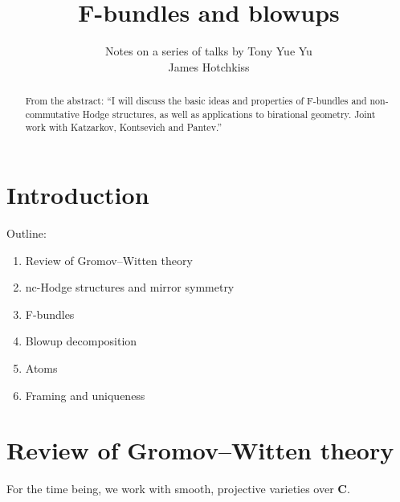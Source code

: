 \documentclass[11pt, reqno]{amsart}
\numberwithin{equation}{section}
\theoremstyle{plain}
\theoremstyle{definition}
\theoremstyle{italicsname}
\newcommand{\bC}{\mathbf{C}}
\begin{document}
\title{F-bundles and blowups}

\author{Notes on a series of talks by Tony Yue Yu \\
James Hotchkiss}



\begin{abstract}
    From the abstract: ``I will discuss the basic ideas and properties of F-bundles and non-commutative Hodge structures, as well as applications to birational geometry. Joint work with Katzarkov, Kontsevich and Pantev.'' 
\end{abstract}

\maketitle

\setcounter{tocdepth}{1}
\tableofcontents

\section*{Introduction} %
\label{sec:intro}



Outline:
\begin{enumerate} [label = (\arabic*)]
    \item Review of Gromov--Witten theory
    \item nc-Hodge structures and mirror symmetry
    \item F-bundles
    \item Blowup decomposition
    \item Atoms
    \item Framing and uniqueness
\end{enumerate}





\section{Review of Gromov--Witten theory} %
\label{sec:review_of_gromov_witten_theory}

For the time being, we work with smooth, projective varieties over $\bC$.
\end{document}
